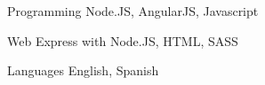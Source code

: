

\begin{cvskills}

  \cvskill
    {Programming} %
    {Node.JS, AngularJS, Javascript} %

  \cvskill
    {Web} %
    {Express with Node.JS, HTML, SASS} %

  \cvskill
    {Languages} %
    {English, Spanish} %

\end{cvskills}
